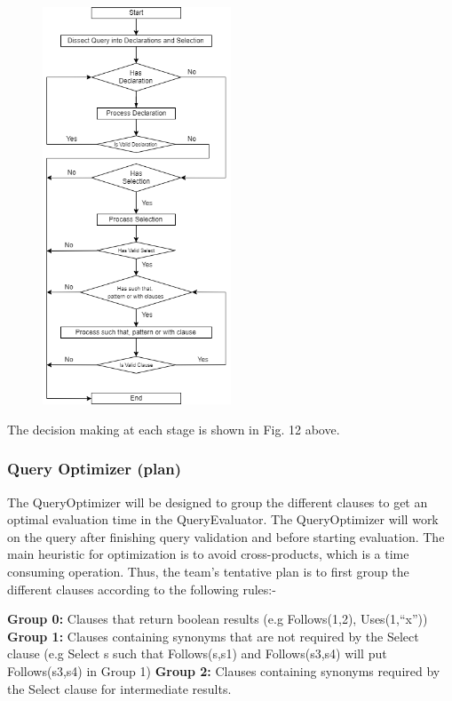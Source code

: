 \documentclass[12pt]{article}
\begin{document}
{{{{{{{{{{\begin{figure}[htbp]
 \includegraphics[width=0.5\textwidth]{ValidatorFlowchart.png}
\end{figure}

The decision making at each stage is shown in Fig. 12 above.
\subsubsection{Query Optimizer (plan)}
The QueryOptimizer will be designed to group the different clauses to get an optimal evaluation time in the QueryEvaluator. The QueryOptimizer will work on the query after finishing query validation and before starting evaluation. 
The main heuristic for optimization is to avoid cross-products, which is a time consuming operation. Thus, the team’s tentative plan is to first group the different clauses according to the following rules:-

\textbf{Group 0:} Clauses that return boolean results (e.g Follows(1,2), Uses(1,“x”)) \newline
\textbf{Group 1:} Clauses containing synonyms that are not required by the Select clause (e.g Select s such that Follows(s,s1) and Follows(s3,s4) will put Follows(s3,s4) in Group 1) \newline
\textbf{Group 2:} Clauses containing synonyms required by the Select clause for intermediate results.

}}}}}}}}}}
\end{document}
